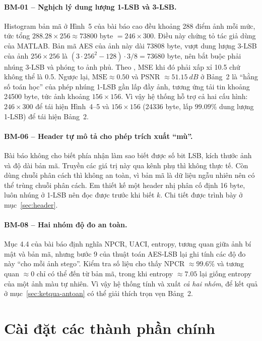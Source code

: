 \paragraph{BM-01 -- Nghịch lý dung lượng 1-LSB và 3-LSB.}
Histogram bản mã ở Hình~5 của bài báo cao đều khoảng 288 điểm ảnh mỗi mức, tức tổng
$288.28 \times 256 \approx \num{73800}$ byte $= 246\times300$. Điều này chứng tỏ tác giả dùng
 của MATLAB. Bản mã AES của ảnh này dài \num{73808} byte, vượt dung lượng 3-LSB của
ảnh $256\times256$ là $(3\cdot256^2 - 128)\cdot 3 / 8 = \num{73680}$ byte, nên bắt buộc phải nhúng
3-LSB và phóng to ảnh phủ. Theo , MSE khi đó phải xấp xỉ 10.5 chứ không thể là 0.5.
Ngược lại, $\mathrm{MSE} \approx 0.50$ và PSNR $\approx \SI{51.15}{dB}$ ở Bảng~2 là ``hằng số toán
học'' của phép nhúng 1-LSB gần lấp đầy ảnh, tương ứng tải tin khoảng \num{24500} byte, tức ảnh
khoảng $156\times156$. Vì vậy hệ thống hỗ trợ cả hai cấu hình: $246\times300$ để tái hiện
Hình~4--5 và $156\times156$ (\num{24336} byte, lấp $99.09\%$ dung lượng 1-LSB) để tái hiện Bảng~2.

\paragraph{BM-06 -- Header tự mô tả cho phép trích xuất ``mù''.}
Bài báo không cho biết phía nhận làm sao biết được số bit LSB, kích thước ảnh và độ dài bản mã.
Truyền các giá trị này qua kênh phụ thì không thực tế. Còn dùng chuỗi phân cách thì không an
toàn, vì bản mã là dữ liệu ngẫu nhiên nên có thể trùng chuỗi phân cách. Em thiết kế một header
nhị phân cố định 16 byte, luôn nhúng ở 1-LSB nên đọc được trước khi biết $k$. Chi tiết được trình
bày ở mục~\ref{sec:header}.

\paragraph{BM-08 -- Hai nhóm độ đo an toàn.}
Mục 4.4 của bài báo định nghĩa NPCR, UACI, entropy, tương quan giữa ảnh bí mật và bản mã, nhưng
bước 9 của thuật toán AES-LSB lại ghi tính các độ đo này ``cho mỗi ảnh stego''. Kiểm tra số liệu
cho thấy NPCR $\approx 99.6\%$ và tương quan $\approx 0$ chỉ có thể đến từ bản mã, trong khi
entropy $\approx 7.05$ lại giống entropy của một ảnh màu tự nhiên. Vì vậy hệ thống tính và xuất
\emph{cả hai nhóm}, để kết quả ở mục~\ref{sec:ketqua-antoan} có thể giải thích trọn vẹn Bảng~2.

\section{Cài đặt các thành phần chính}
\label{sec:caidat}

